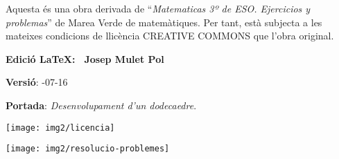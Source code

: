 \vspace*{12.5cm}
 \begin{center}
 	\begin{minipage}{0.5\textwidth}
 		Aquesta és una obra derivada de ``\textit{Matematicas 3º de ESO. Ejercicios y problemas}'' de Marea Verde de matemàtiques. Per tant, està subjecta a les mateixes condicions de llicència CREATIVE COMMONS que l'obra original.
 		
 		 \noindent \textbf{Edició \LaTeX: \quad \textregistered \,  Josep Mulet Pol}
 		
 		 \noindent \textbf{Versió}: -07-16
 		 
 		 \noindent \textbf{Portada}: \quad \textit{Desenvolupament d'un dodecaedre}.
 		 
 		
 		\begin{center}
 		\texttt{[image: img2/licencia]}
 		\end{center}
 	\end{minipage}
 \end{center}
 

\renewcommand{\thepage}{\Roman{page}}%
\pagestyle{myheadings}
\thispagestyle{empty}
\renewcommand{\headrulewidth}{0pt}
\renewcommand{\footrulewidth}{0pt}

\pagebreak


\dominitoc

\tableofcontents

\newpage

\vspace*{\fill}
\begin{center}
	\texttt{[image: img2/resolucio-problemes]}
\end{center}
\vspace*{\fill}



\cleartorightpage


\vspace*{2cm} 

